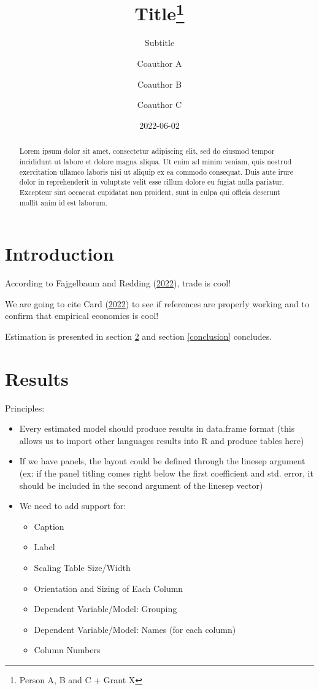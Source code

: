 \documentclass[
  12pt,
]{article}
\title{Title\thanks{Person A, B and C + Grant X}}
\subtitle{Subtitle}
\author{Coauthor A \and Coauthor B \and Coauthor C}
\date{2022-06-02}
\providecommand{\tightlist}{%
  \setlength{\itemsep}{0pt}\setlength{\parskip}{0pt}}
\begin{document}
\maketitle
\begin{abstract}
Lorem ipsum dolor sit amet, consectetur adipiscing elit, sed do eiusmod tempor incididunt ut labore et dolore magna aliqua. Ut enim ad minim veniam, quis nostrud exercitation ullamco laboris nisi ut aliquip ex ea commodo consequat. Duis aute irure dolor in reprehenderit in voluptate velit esse cillum dolore eu fugiat nulla pariatur. Excepteur sint occaecat cupidatat non proident, sunt in culpa qui officia deserunt mollit anim id est laborum.
\end{abstract}

\newpage

\hypertarget{intro}{%
\section{Introduction}\label{intro}}

According to Fajgelbaum and Redding (\protect\hyperlink{ref-fajgelbaum_trade_2022}{2022}), trade is cool!

We are going to cite Card (\protect\hyperlink{ref-card_design-based_2022}{2022}) to see if references are properly
working and to confirm that empirical economics is cool!

Estimation is presented in section \ref{results} and section \ref{conclusion}
concludes.

\hypertarget{results}{%
\section{Results}\label{results}}

Principles:

\begin{itemize}
\tightlist
\item
  Every estimated model should produce results in data.frame format (this allows
  us to import other languages results into R and produce tables here)
\item
  If we have panels, the layout could be defined through the linesep argument
  (ex: if the panel titling comes right below the first coefficient and std. error,
  it should be included in the second argument of the linesep vector)
\item
  We need to add support for:

  \begin{itemize}
  \tightlist
  \item
    Caption
  \item
    Label
  \item
    Scaling Table Size/Width
  \item
    Orientation and Sizing of Each Column
  \item
    Dependent Variable/Model: Grouping
  \item
    Dependent Variable/Model: Names (for each column)
  \item
    Column Numbers
  \end{itemize}
\end{itemize}
\end{document}
